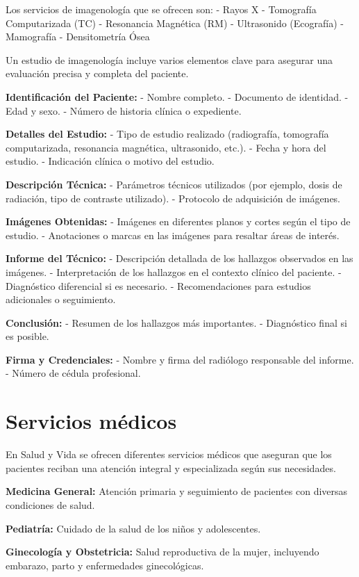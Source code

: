 \documentclass[
  letterpaper,
  DIV=11,
  numbers=noendperiod]{scrreprt}
\begin{document}
Los servicios de imagenología que se ofrecen son: - Rayos X - Tomografía
Computarizada (TC) - Resonancia Magnética (RM) - Ultrasonido (Ecografía)
- Mamografía - Densitometría Ósea

Un estudio de imagenología incluye varios elementos clave para asegurar
una evaluación precisa y completa del paciente.

\textbf{Identificación del Paciente:} - Nombre completo. - Documento de
identidad. - Edad y sexo. - Número de historia clínica o expediente.

\textbf{Detalles del Estudio:} - Tipo de estudio realizado (radiografía,
tomografía computarizada, resonancia magnética, ultrasonido, etc.). -
Fecha y hora del estudio. - Indicación clínica o motivo del estudio.

\textbf{Descripción Técnica:} - Parámetros técnicos utilizados (por
ejemplo, dosis de radiación, tipo de contraste utilizado). - Protocolo
de adquisición de imágenes.

\textbf{Imágenes Obtenidas:} - Imágenes en diferentes planos y cortes
según el tipo de estudio. - Anotaciones o marcas en las imágenes para
resaltar áreas de interés.

\textbf{Informe del Técnico:} - Descripción detallada de los hallazgos
observados en las imágenes. - Interpretación de los hallazgos en el
contexto clínico del paciente. - Diagnóstico diferencial si es
necesario. - Recomendaciones para estudios adicionales o seguimiento.

\textbf{Conclusión:} - Resumen de los hallazgos más importantes. -
Diagnóstico final si es posible.

\textbf{Firma y Credenciales:} - Nombre y firma del radiólogo
responsable del informe. - Número de cédula profesional.

\section{Servicios médicos}\label{servicios-muxe9dicos}

En Salud y Vida se ofrecen diferentes servicios médicos que aseguran que
los pacientes reciban una atención integral y especializada según sus
necesidades.

\textbf{Medicina General:} Atención primaria y seguimiento de pacientes
con diversas condiciones de salud.

\textbf{Pediatría:} Cuidado de la salud de los niños y adolescentes.

\textbf{Ginecología y Obstetricia:} Salud reproductiva de la mujer,
incluyendo embarazo, parto y enfermedades ginecológicas.
\end{document}
